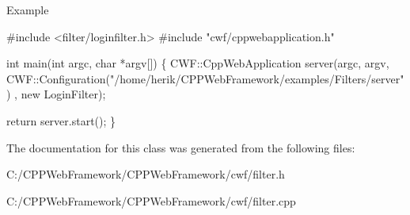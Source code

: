 \begin{DoxyParagraph}{Example}
\begin{DoxyCode}
\textcolor{preprocessor}{#include <filter/loginfilter.h>}
\textcolor{preprocessor}{#include "cwf/cppwebapplication.h"}

\textcolor{keywordtype}{int} main(\textcolor{keywordtype}{int} argc, \textcolor{keywordtype}{char} *argv[])
\{
    CWF::CppWebApplication server(argc,
                                  argv,
                                  CWF::Configuration(\textcolor{stringliteral}{"/home/herik/CPPWebFramework/examples/Filters/server"})
      ,
                                  \textcolor{keyword}{new} LoginFilter);

    \textcolor{keywordflow}{return} server.start();
\}
\end{DoxyCode}
 
\end{DoxyParagraph}


The documentation for this class was generated from the following files\+:\begin{DoxyCompactItemize}
\item 
C\+:/\+C\+P\+P\+Web\+Framework/\+C\+P\+P\+Web\+Framework/cwf/filter.\+h\item 
C\+:/\+C\+P\+P\+Web\+Framework/\+C\+P\+P\+Web\+Framework/cwf/filter.\+cpp\end{DoxyCompactItemize}
